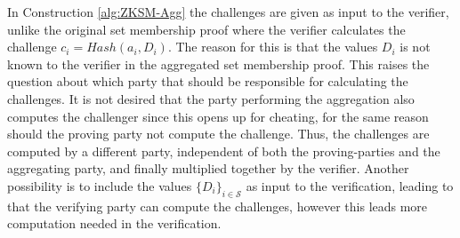 In Construction \ref{alg:ZKSM-Agg} the challenges are given as input to the verifier, unlike the original set membership proof where the verifier calculates the challenge $c_i=Hash(a_i,D_i)$. The reason for this is that the values $D_i$ is not known to the verifier in the aggregated set membership proof. This raises the question about which party that should be responsible for calculating the challenges.  It is not desired that the party performing the aggregation also computes the challenger since this opens up for cheating, for the same reason should the proving party not compute the challenge. Thus, the challenges are computed by a different party, independent of both the proving-parties and the aggregating party, and finally multiplied together by the verifier. Another possibility is to include the values $\{D_i\}_{i\in\mathcal{S}}$ as input to the verification, leading to that the verifying party can compute the challenges, however this leads more computation needed in the verification.





 

